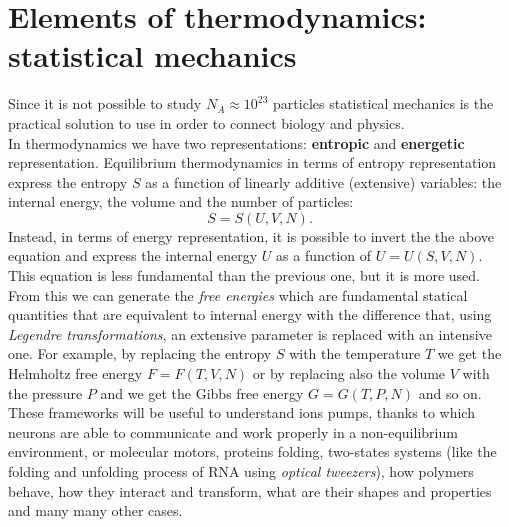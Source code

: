 \documentclass[../main/main.tex]{subfiles}
\begin{document}
\section{Elements of thermodynamics: statistical mechanics}
Since it is not possible to study $N_A\approx10^{23}$ particles statistical mechanics is the practical solution to use in order to connect biology and physics.\\
In thermodynamics we have two representations: \textbf{entropic} and \textbf{energetic} representation.
Equilibrium thermodynamics in terms of entropy representation express the entropy $S$ as a function of linearly additive (extensive) variables: the internal energy, the volume and the number of particles: $$S=S(U, V, N).$$
Instead, in terms of energy representation, it is possible to invert the the above equation and express the internal energy $U$ as a function of $U=U(S, V, N)$. This equation is less fundamental than the previous one, but it is more used. From this we can generate the \emph{free energies} which are fundamental statical quantities that are equivalent to internal energy with the difference that, using \emph{Legendre transformations}, an extensive parameter is replaced with an intensive one.
For example, by replacing the entropy $S$ with the temperature $T$ we get the Helmholtz free energy $F=F(T,V,N)$ or by replacing also the volume $V$ with the pressure $P$ and we get the Gibbs free energy $G=G(T,P,N)$ and so on.
These frameworks will be useful to understand ions pumps, thanks to which neurons are able to communicate and work properly in a non-equilibrium environment, or molecular motors, proteins folding, two-states systems (like the folding and unfolding process of RNA using \emph{optical tweezers}), how polymers behave, how they interact and transform, what are their shapes and properties and many many other cases.  
\end{document}
